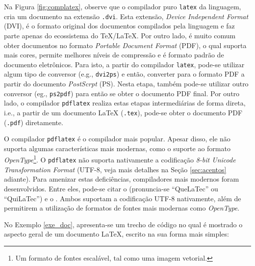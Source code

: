 Na Figura \ref{fig:complatex}, observe que o compilador puro {\tt latex} da linguagem, cria um documento na extensão {\tt .dvi}. Esta extensão, \textit{Device Independent Format} (DVI), é o formato original dos documentos compilados pela linguagem e faz parte apenas do ecossistema do \TeX{}/\LaTeX{}. Por outro lado, é muito comum obter documentos no formato \textit{Portable Document Format} (PDF), o qual suporta mais cores, permite melhores níveis de compressão e é formato padrão de documento eletrônicos. Para isto, a partir do compilador {\tt latex}, pode-se utilizar algum tipo de conversor (e.g., {\tt dvi2ps}) e então, converter para o formato PDF a partir do documento \textit{PostScrpt} (PS). Nesta etapa, também pode-se utilizar outro conversor (eg., {\tt ps2pdf}) para então se obter o documento PDF final. Por outro lado, o compilador {\tt pdflatex} realiza estas etapas intermediárias de forma direta, i.e., a partir de um documento \LaTeX{} ({\tt .tex}), pode-se obter o documento PDF ({\tt .pdf}) diretamente. 

O compilador {\tt pdflatex} é o compilador mais popular. Apesar disso, ele não suporta algumas características mais modernas, como o suporte ao formato \textit{OpenType}\footnote{Um formato de fontes escalável, tal como uma imagem vetorial.}. O {\tt pdflatex} não suporta nativamente a codificação \textit{8-bit Unicode Transformation Format} (UTF-8, veja mais detalhes na Seção \ref{sec:acentos} adiante). Para amenizar estas deficiências, compiladores mais modernos foram desenvolvidos. Entre eles, pode-se citar o \XeLaTeX{} (pronuncia-se ``QueLaTec'' ou ``QuiLaTec'') e o \LuaTeX{}. Ambos suportam a codificação UTF-8 nativamente, além de permitirem a utilização de formatos de fontes mais modernas como \textit{OpenType}.

No Exemplo \ref{exe_doc}, apresenta-se um trecho de código no qual é mostrado o aspecto geral de um documento \LaTeX{}, escrito na sua forma mais simples:

